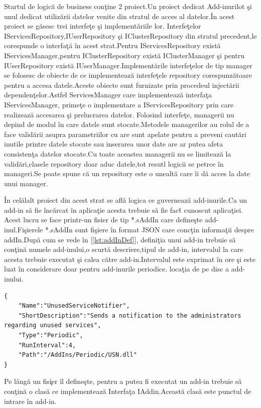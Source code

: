 \documentclass[a4paper,12pt]{report}
\let\oldref\ref
\renewcommand{\ref}[1]{[\oldref{#1}]}
\begin{document}
Startul  de logic\u a de business con\c tine 2 proiect.Un proiect dedicat Add-inurilot \c si unul dedicat utiliz\u arii 
datelor venite din stratul de acces al datelor.\^In acest proiect se g\u asesc trei interfe\c te \c si implement\u ariile lor.
Interfe\c telor IServicesRepository,IUserRepository \c si IClusterRepository  din stratul precedent,le corespunde o 
interfa\c t\u a \^in acest strat.Pentru IServicesRepository exist\u a IServicesManager,pentru IClusterRepository exist\u a 
IClusterManager \c si pentru IUserRepository exist\u a IUserManager.Implement\u arile interfe\c telor de tip manager se folosesc
de obiecte de ce implementeaz\u a interfe\c tele repository corespunz\u atoare pentru a accesa datele.Aceste obiecte sunt 
furnizate prin procedeul inject\u arii dependen\c telor.Astfel ServicesManager care  implementeaz\u a interfa\c ta 
IServicesManager, prime\c te o implementare a IServicesRepository prin care realizeaz\u a accesarea \c si prelucrarea datelor.
Folosind interfe\c te, managerii nu depind de modul \^in care datele sunt stocate.Metodele managerilor au rolul de a face 
valid\u arii asupra parametriilor cu are sunt apelate pentru a preveni caut\u ari inutile printre datele stocate sau
inserarea unor date are ar putea afeta consisten\c ta datelor stocate.Cu toate aceastea managerii nu se limiteaz\u a 
la valid\u ari,clasele repository doar aduc datele,tot resutl logicii se petrce \^in manageri.Se poate spune c\u a un repository
este o unealt\u a care \^ii d\u a acces la date unui manager.

\^In cel\u alalt proiect din acest strat se afl\u a logica ce guverneaz\u a add-inurile.Ca un add-in 
s\u a fie \^inc\u arcat \^in aplica\c tie acesta trebuie s\u a fie fac\u t cunoscut aplica\c tiei.
Acest lucru se face printr-un fisier de tip *.sAddIn care define\c ste add-inul.Fi\c sierele *.sAddIn sunt fi\c siere
\^in format JSON care conc\c tin informa\c tii despre addIn.Dup\u a  cum se vede \^in \ref{lst:addInDef}, defini\c tia 
unui add-in trebuie s\u a con\c tin\u a numele add-inului,o scurt\u a descriere,tipul de add-in, intervalul la care 
acesta trebuie executat \c si calea c\u atre add-in.Intervalul este exprimat \^in ore \c si este luat \^in considerare 
doar pentru add-inurile periodice.
loca\c tia de pe disc a add-inului. 
\begin{lstlisting}[caption={Defini\c tie a unui AddIn},label={lst:addInDef},breaklines]
{
	"Name":"UnusedServiceNotifier",
	"ShortDescription":"Sends a notification to the administrators regarding unused services",
	"Type":"Periodic",
	"RunInterval":4,
	"Path":"/AddIns/Periodic/USN.dll"
}
\end{lstlisting}
Pe l\^ang\u a un fis\c ier \^il define\c ste, pentru a putea fi executat un add-in trebuie s\u a con\c tin\u a o clas\u a 
ce implementeaz\u a Interfa\c ta IAddin.Aceast\u a clas\u a este punctul de intrare \^in add-in.
\end{document}
